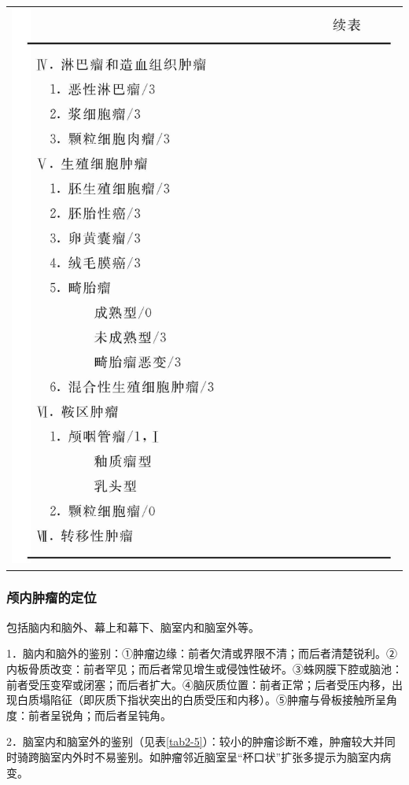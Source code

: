 \begin{longtable}{c}
\includegraphics[width=\textwidth,height=\textheight,keepaspectratio]{./images/Image00063.jpg}
\end{longtable}


\subsubsection{颅内肿瘤的定位}

包括脑内和脑外、幕上和幕下、脑室内和脑室外等。

1．脑内和脑外的鉴别：①肿瘤边缘：前者欠清或界限不清；而后者清楚锐利。②内板骨质改变：前者罕见；而后者常见增生或侵蚀性破坏。③蛛网膜下腔或脑池：前者受压变窄或闭塞；而后者扩大。④脑灰质位置：前者正常；后者受压内移，出现白质塌陷征（即灰质下指状突出的白质受压和内移）。⑤肿瘤与骨板接触所呈角度：前者呈锐角；而后者呈钝角。

2．脑室内和脑室外的鉴别（见表\ref{tab2-5}）：较小的肿瘤诊断不难，肿瘤较大并同时骑跨脑室内外时不易鉴别。如肿瘤邻近脑室呈“杯口状”扩张多提示为脑室内病变。

